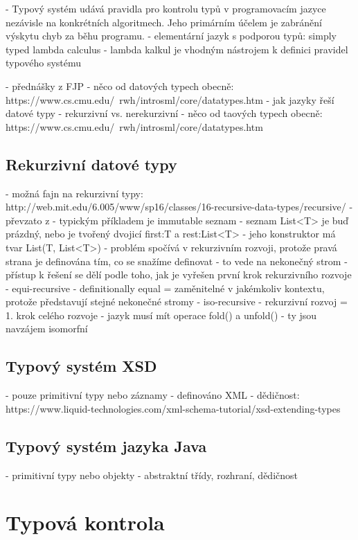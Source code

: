 \documentclass[czech,DP]{thesiskiv}
\begin{document}
- Typový systém udává pravidla pro kontrolu typů v programovacím jazyce nezávisle na konkrétních algoritmech. Jeho primárním účelem je zabránění výskytu chyb za běhu programu\cite{cardelli2004}.
- elementární jazyk s podporou typů: simply typed lambda calculus
- lambda kalkul je vhodným nástrojem k definici pravidel typového systému

- přednášky z FJP
- něco od datových typech obecně: https://www.cs.cmu.edu/~rwh/introsml/core/datatypes.htm
- jak jazyky řeší datové typy
	- rekurzivní vs. nerekurzivní
- něco od taových typech obecně: https://www.cs.cmu.edu/~rwh/introsml/core/datatypes.htm

\subsection{Rekurzivní datové typy}

- možná fajn na rekurzivní typy: http://web.mit.edu/6.005/www/sp16/classes/16-recursive-data-types/recursive/
- převzato z \cite{pierce2002}
- typickým příkladem je immutable seznam
	- seznam List<T> je buď prázdný, nebo je tvořený dvojicí first:T a rest:List<T>
	- jeho konstruktor má tvar List(T, List<T>)
- problém spočívá v rekurzivním rozvoji, protože pravá strana je definována tím, co se snažíme definovat
- to vede na nekonečný strom
- přístup k řešení se dělí podle toho, jak je vyřešen první krok rekurzivního rozvoje
	- equi-recursive
		- definitionally equal = zaměnitelné v jakémkoliv kontextu, protože představují stejné nekonečné stromy
	- iso-recursive
		- rekurzivní rozvoj = 1. krok celého rozvoje
		- jazyk musí mít operace fold() a unfold()
		- ty jsou navzájem isomorfní

\subsection{Typový systém XSD}

 - pouze primitivní typy nebo záznamy
 - definováno XML
 - dědičnost: https://www.liquid-technologies.com/xml-schema-tutorial/xsd-extending-types

\subsection{Typový systém jazyka Java}

 - primitivní typy nebo objekty
 - abstraktní třídy, rozhraní, dědičnost

\section{Typová kontrola}
\end{document}
